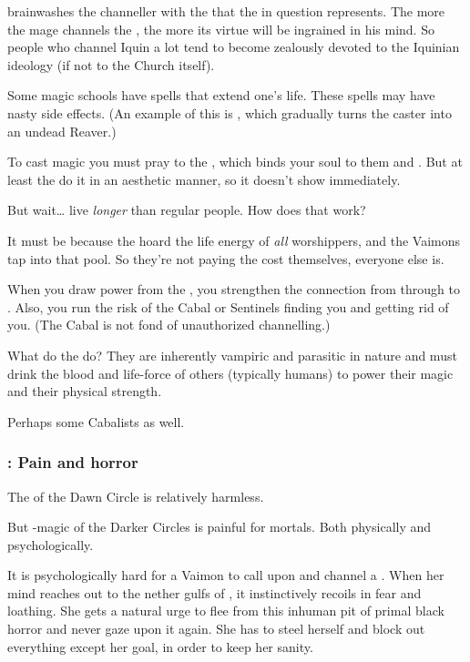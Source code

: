 \Iquin{} brainwashes the channeller with the  that the \Sephirah{} in question represents. The more the mage channels the \Sephirah{}, the more its virtue will be ingrained in his mind. So people who channel Iquin a lot tend to become zealously devoted to the Iquinian ideology (if not to the Church itself). 

Some magic schools have spells that extend one's life. 
These spells may have nasty side effects. 
(An example of this is , which gradually turns the caster into an undead Reaver.) 

To cast  magic you must pray to the \sephiroth, which binds your soul to them and . But at least the \sephiroth{} do it in an aesthetic manner, so it doesn't show immediately. 

But wait\ldots{}  live \emph{longer} than regular people. How does that work? 

It must be because the \sephiroth{} hoard the life energy of \emph{all} worshippers, and the Vaimons tap into that pool. So they're not paying the cost themselves, everyone else is. 

When you draw power from the \qliphoth, you strengthen the connection from \Miith{} through  to . 
Also, you run the risk of the Cabal or Sentinels finding you and getting rid of you. 
(The Cabal is not fond of unauthorized  channelling.)

What do the  do? They are inherently vampiric and parasitic in nature and must drink the blood and life-force of others (typically humans) to power their magic and their physical strength. 

Perhaps some Cabalists  as well.





\subsubsection{\Itzach: Pain and horror}
The \qliphoth{} of the Dawn Circle is relatively harmless. 

But \qliphah-magic of the Darker Circles is painful for mortals. 
Both physically and psychologically. 

It is psychologically hard for a Vaimon to call upon and channel a \qliphah{}. 
When her mind reaches out to the nether gulfs of \Itzach, it instinctively recoils in fear and loathing. 
She gets a natural urge to flee from this inhuman pit of primal black horror and never gaze upon it again. 
She has to steel herself and block out everything except her goal, in order to keep her sanity. 

